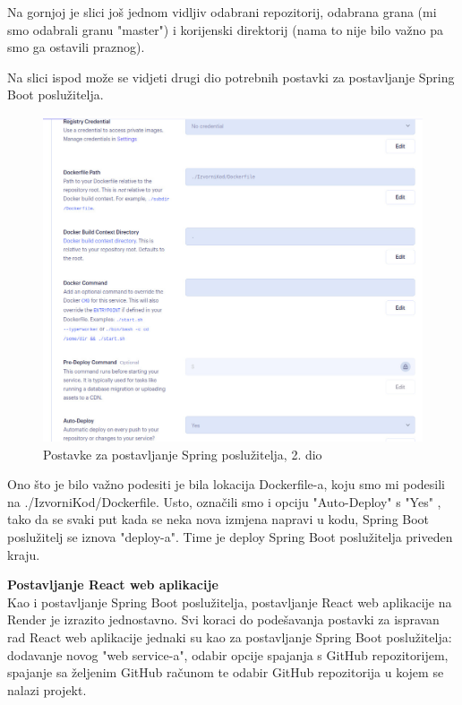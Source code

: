		Na gornjoj je slici još jednom vidljiv odabrani repozitorij, odabrana grana (mi smo odabrali granu "master") i korijenski direktorij (nama to nije bilo važno pa smo ga ostavili praznog).
		
		Na slici ispod može se vidjeti drugi dio potrebnih postavki za postavljanje Spring Boot poslužitelja.
		
				\begin{figure}[H]
			\includegraphics[scale=0.4]{slike/Render_BACKEND_2.JPG} %
			\centering
			\caption{Postavke za postavljanje Spring poslužitelja, 2. dio}
			\label{Postavke za postavljanje Spring poslužitelja, 2. dio}
		\end{figure}
		
		Ono što je bilo važno podesiti je bila lokacija Dockerfile-a, koju smo mi podesili na ./IzvorniKod/Dockerfile. Usto, označili smo i opciju "Auto-Deploy" s "Yes" , tako da se svaki put kada se neka nova izmjena napravi u kodu, Spring Boot poslužitelj se iznova "deploy-a". Time je deploy Spring Boot poslužitelja priveden kraju.
		
	\textbf{Postavljanje React web aplikacije} \\
	Kao i postavljanje Spring Boot poslužitelja, postavljanje React web aplikacije na Render je izrazito jednostavno. Svi koraci do podešavanja postavki za ispravan rad React web aplikacije jednaki su kao za postavljanje Spring Boot poslužitelja: dodavanje novog "web service-a", odabir opcije spajanja s GitHub repozitorijem, spajanje sa željenim GitHub računom te odabir GitHub repozitorija u kojem se nalazi projekt.
	
